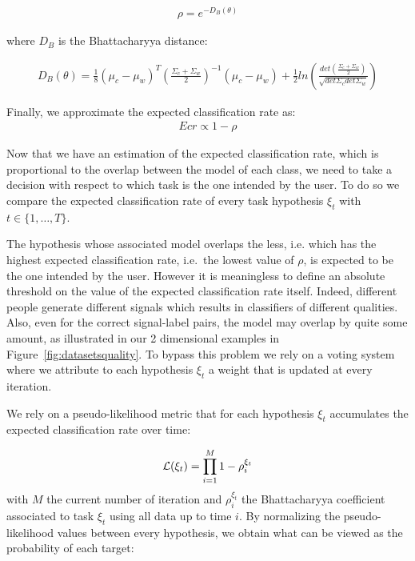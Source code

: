 \begin{eqnarray}
\rho = e^{-D_B(\theta)}
\end{eqnarray}

where $D_B$ is the Bhattacharyya distance:

\begin{eqnarray}
D_B(\theta) = \frac{1}{8}(\mu_c-\mu_w)^T(\frac{\Sigma_c+\Sigma_w}{2})^{-1}(\mu_c-\mu_w)+\frac{1}{2}ln\left(\frac{det(\frac{\Sigma_c+\Sigma_w}{2})}{\sqrt{det\Sigma_c det\Sigma_w}}\right)
\end{eqnarray}

Finally, we approximate the expected classification rate as:
\begin{eqnarray}
Ecr \propto 1 - \rho
\end{eqnarray}

Now that we have an estimation of the expected classification rate, which is proportional to the overlap between the model of each class, we need to take a decision with respect to which task is the one intended by the user. To do so we compare the expected classification rate of every task hypothesis $\xi_t$ with $t \in \{1, \ldots, T\}$. 

The hypothesis whose associated model overlaps the less, i.e. which has the highest expected classification rate, i.e.\ the lowest value of $\rho$, is expected to be the one intended by the user. However it is meaningless to define an absolute threshold on the value of the expected classification rate itself. Indeed, different people generate different signals which results in classifiers of different qualities. Also, even for the correct signal-label pairs, the model may overlap by quite some amount, as illustrated in our 2 dimensional examples in Figure~\ref{fig:datasetsquality}. To bypass this problem we rely on a voting system where we attribute to each hypothesis $\xi_t$ a weight that is updated at every iteration.

We rely on a pseudo-likelihood metric that for each hypothesis $\xi_t$ accumulates the expected classification rate over time:

\begin{eqnarray}
\mathcal{L}(\xi_t) = \prod_{i = 1}^{M} 1 - \rho_i^{\xi_t}
\end{eqnarray}
%
with $M$ the current number of iteration and $\rho_i^{\xi_t}$ the Bhattacharyya coefficient associated to task $\xi_t$ using all data up to time $i$. By normalizing the pseudo-likelihood values between every hypothesis, we obtain what can be viewed as the probability of each target:

